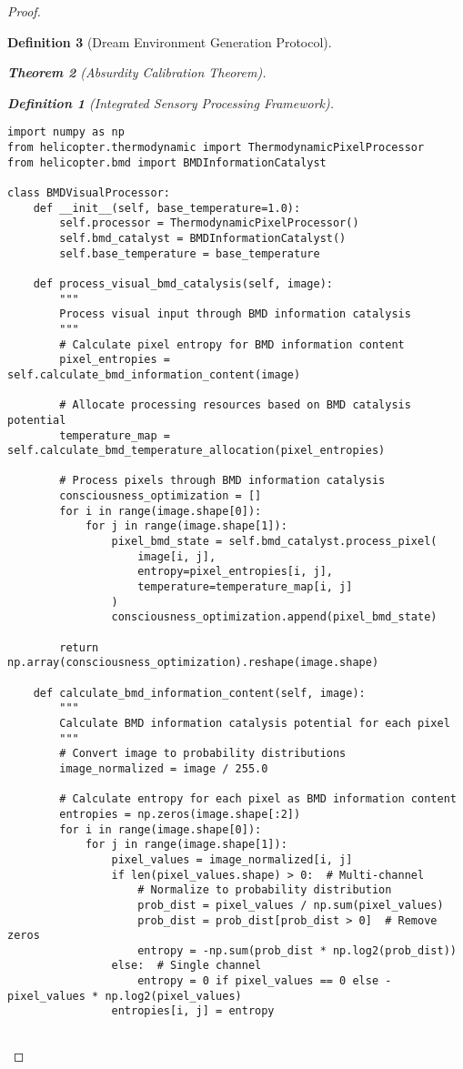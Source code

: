 \documentclass[12pt,a4paper]{article}
\newtheorem{theorem}{Theorem}[section]
\newtheorem{definition}[theorem]{Definition}
\begin{document}
\begin{proof}
\begin{definition}[Dream Environment Generation Protocol]
\begin{theorem}[Absurdity Calibration Theorem]
\begin{observation}
\begin{definition}[Integrated Sensory Processing Framework]
\begin{lstlisting}[style=pythonstyle, caption=BMD Thermodynamic Pixel Processing]
import numpy as np
from helicopter.thermodynamic import ThermodynamicPixelProcessor
from helicopter.bmd import BMDInformationCatalyst

class BMDVisualProcessor:
    def __init__(self, base_temperature=1.0):
        self.processor = ThermodynamicPixelProcessor()
        self.bmd_catalyst = BMDInformationCatalyst()
        self.base_temperature = base_temperature
        
    def process_visual_bmd_catalysis(self, image):
        """
        Process visual input through BMD information catalysis
        """
        # Calculate pixel entropy for BMD information content
        pixel_entropies = self.calculate_bmd_information_content(image)
        
        # Allocate processing resources based on BMD catalysis potential
        temperature_map = self.calculate_bmd_temperature_allocation(pixel_entropies)
        
        # Process pixels through BMD information catalysis
        consciousness_optimization = []
        for i in range(image.shape[0]):
            for j in range(image.shape[1]):
                pixel_bmd_state = self.bmd_catalyst.process_pixel(
                    image[i, j],
                    entropy=pixel_entropies[i, j],
                    temperature=temperature_map[i, j]
                )
                consciousness_optimization.append(pixel_bmd_state)
        
        return np.array(consciousness_optimization).reshape(image.shape)
    
    def calculate_bmd_information_content(self, image):
        """
        Calculate BMD information catalysis potential for each pixel
        """
        # Convert image to probability distributions
        image_normalized = image / 255.0
        
        # Calculate entropy for each pixel as BMD information content
        entropies = np.zeros(image.shape[:2])
        for i in range(image.shape[0]):
            for j in range(image.shape[1]):
                pixel_values = image_normalized[i, j]
                if len(pixel_values.shape) > 0:  # Multi-channel
                    # Normalize to probability distribution
                    prob_dist = pixel_values / np.sum(pixel_values)
                    prob_dist = prob_dist[prob_dist > 0]  # Remove zeros
                    entropy = -np.sum(prob_dist * np.log2(prob_dist))
                else:  # Single channel
                    entropy = 0 if pixel_values == 0 else -pixel_values * np.log2(pixel_values)
                entropies[i, j] = entropy
        

\end{lstlisting}
\end{definition}
\end{observation}
\end{theorem}
\end{definition}
\end{proof}
\end{document}
